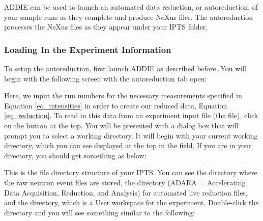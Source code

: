 ADDIE can be used to launch an automated data reduction, or autoreduction, of your sample runs as they complete and produce NeXus files. The autoreduction processes the NeXus files as they appear under your IPTS folder.

\subsubsection{Loading In the Experiment Information}

To setup the autoreduction, first launch ADDIE as described before. You will begin with the following screen with the autoreduction tab open:

\noindent{}

Here, we input the run numbers for the necessary measurements specified in Equation \ref{eq_intensities} in order to create our reduced data, Equation \ref{eq_reduction}. To read in this data from an experiment input file (the  file), click on the  button at the top. You will be presented with a dialog box that will prompt you to select a working directory. It will begin with your current working directory, which you can see displayed at the top in the  field. If you are in your \iptsPrint directory, you should get something as below:

\noindent{}

This is the file directory structure of your IPTS. You can see the  directory where the raw neutron event files are stored, the  directory (ADARA = Accelerating Data Acquisition, Reduction, and Analysis) for automated live reduction files, and the  directory, which is a User workspace for the experiment. Double-click the  directory and you will see something similar to the following:

